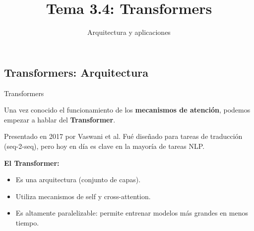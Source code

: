 \documentclass[aspectratio=169]{beamer}
\title{Tema 3.4: Transformers}
\subtitle{Arquitectura y aplicaciones}
\begin{document}
\begin{frame}[plain]
	\titlepage 
\end{frame}

\logo{}


\subsection{Transformers: Arquitectura}

\begin{frame}{Transformers}
  
  Una vez conocido el funcionamiento de los \textbf{mecanismos de atención}, podemos empezar a hablar del \textbf{Transformer}.\\
  \vspace{.5cm}
  \begin{block}{}
    Presentado en 2017 por Vaswani et al. Fué diseñado para tareas de traducción (seq-2-seq), pero hoy en día es clave en la mayoría de tareas NLP.
  \end{block}
  \vspace{.5cm}
  \textbf{El Transformer:}
  \begin{itemize}
    \item Es una arquitectura (conjunto de capas).
    \item Utiliza mecanismos de self y cross-attention.
    \item Es altamente paralelizable: permite entrenar modelos más grandes en menos tiempo.
  \end{itemize}
\end{frame}
\end{document}
